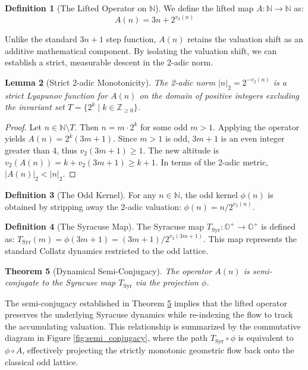 \documentclass[11pt, a4paper]{article}
\newtheorem{theorem}{Theorem}[section]
\newtheorem{lemma}[theorem]{Lemma}
\theoremstyle{definition}
\newtheorem{definition}[theorem]{Definition}
\begin{document}
\begin{definition}[The Lifted Operator on \texorpdfstring{$\mathbb{N}$}{N}]
We define the lifted map $A:\mathbb{N}\rightarrow\mathbb{N}$ as:
\begin{equation}
A(n)=3n+2^{v_{2}(n)}
\end{equation}
\end{definition}

Unlike the standard $3n+1$ step function, $A(n)$ retains the valuation shift as an additive mathematical component. By isolating the valuation shift, we can establish a strict, measurable descent in the 2-adic norm.

\begin{lemma}[Strict 2-adic Monotonicity]
\label{lem:monotone}
The 2-adic norm $|n|_{2}=2^{-v_{2}(n)}$ is a strict Lyapunov function for $A(n)$ on the domain of positive integers excluding the invariant set $T = \{2^k \mid k \in \mathbb{Z}_{\ge 0}\}$.
\end{lemma}

\begin{proof}
Let $n \in \mathbb{N} \setminus T$. Then $n = m \cdot 2^{k}$ for some odd $m > 1$. Applying the operator yields $A(n)=2^{k}(3m+1)$. Since $m>1$ is odd, $3m+1$ is an even integer greater than 4, thus $v_{2}(3m+1)\ge1$. The new altitude is $v_{2}(A(n))=k+v_{2}(3m+1)\ge k+1$. In terms of the 2-adic metric, $|A(n)|_{2} < |n|_{2}$.
\end{proof}

\begin{definition}[The Odd Kernel]
For any $n\in\mathbb{N}$, the odd kernel $\phi(n)$ is obtained by stripping away the 2-adic valuation:
$\phi(n)=n/2^{v_{2}(n)}$.
\end{definition}

\begin{definition}[The Syracuse Map]
The Syracuse map $T_{\text{Syr}} : \mathbb{O}^{+} \rightarrow \mathbb{O}^{+}$ is defined as:
$T_{\text{Syr}}(m) = \phi(3m+1) = (3m+1)/2^{v_2(3m+1)}$.
This map represents the standard Collatz dynamics restricted to the odd lattice.
\end{definition}

\begin{theorem}[Dynamical Semi-Conjugacy]
\label{thm:semi_conjugacy}
The operator $A(n)$ is semi-conjugate to the Syracuse map $T_{\text{Syr}}$ via the projection $\phi$.
\end{theorem}

The semi-conjugacy established in Theorem \ref{thm:semi_conjugacy} implies that the lifted operator preserves the underlying Syracuse dynamics while re-indexing the flow to track the accumulating valuation. This relationship is summarized by the commutative diagram in Figure \ref{fig:semi_conjugacy}, where the path $T_{\text{Syr}} \circ \phi$ is equivalent to $\phi \circ A$, effectively projecting the strictly monotonic geometric flow back onto the classical odd lattice.
\end{document}
